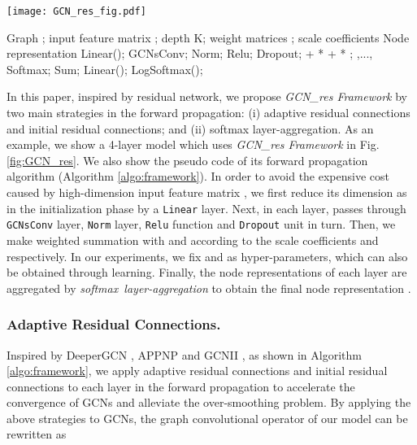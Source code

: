 \documentclass[runningheads]{llncs}
\begin{document}
\begin{figure*}[htbp]
    \centering
    \texttt{[image: GCN\_res\_fig.pdf]}
    \caption{Overview of \textsl{GCN\_res Framework} with a 4-layer toy example. The GCNs-Block consists of four parts: \texttt{GCNsConv} layer, \texttt{Norm} layer, activation function, and \texttt{Dropout} unit. Data stream of residual connections is indicated by arrows.}
    \label{fig:GCN_res}
\end{figure*}

\begin{algorithm}[h]
\caption{GCN\_res Framework (i.e., forward propagation)}
\label{algo:framework}
\begin{algorithmic}[1]
\REQUIRE Graph ; input feature matrix ; depth K; weight matrices ; scale coefficients 
\ENSURE Node representation 
\STATE   Linear();
    \STATE   GCNsConv;
    \STATE   Norm;
    \STATE   Relu;
    \STATE   Dropout;
    \STATE    +  *  +  * ;
\ENDFOR
\STATE ,...,  Softmax;
    \STATE   
\ENDFOR
\STATE   Sum;
\STATE   Linear();
\STATE   LogSoftmax();
\end{algorithmic}
\end{algorithm}


In this paper, inspired by residual network, we
propose \textsl{GCN\_res Framework} by two main strategies in the forward propagation: (i) adaptive residual connections and initial residual connections; and (ii) softmax layer-aggregation. As an example, we show a 4-layer model which uses \textsl{GCN\_res Framework} in Fig. \ref{fig:GCN_res}. We also show the pseudo code of its forward propagation algorithm (Algorithm \ref{algo:framework}). In order to avoid the
expensive cost caused by high-dimension 
input feature matrix , we first reduce its dimension as  in the initialization phase by a \texttt{Linear} layer. Next, in each layer,  passes through
\texttt{GCNsConv} layer, \texttt{Norm} layer, \texttt{Relu} function and \texttt{Dropout} unit
in turn. Then, we make  weighted summation with  and  according to the scale coefficients  and  respectively. In our experiments, we fix
 and  as hyper-parameters, which can also be obtained through learning. Finally, the node
representations  of each layer are
aggregated by \textsl{softmax\ layer-aggregation} to obtain the final node representation .



\subsubsection{Adaptive Residual Connections.} Inspired by DeeperGCN \cite{li2020deepergcn}, APPNP \cite{klicpera2018predict} and GCNII \cite{chen2020simple}, as shown in Algorithm \ref{algo:framework}, we apply adaptive residual connections and
initial residual connections to each layer in the forward
propagation to accelerate the convergence of GCNs and
alleviate the over-smoothing problem. By applying the above strategies to GCNs, the graph convolutional operator of our model can be rewritten as 
\end{document}
